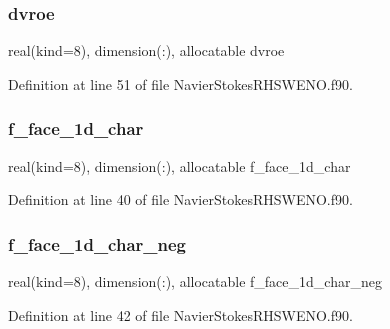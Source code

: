 \subsubsection{\texorpdfstring{dvroe}{dvroe}}
{\footnotesize\ttfamily real(kind=8), dimension(\+:), allocatable dvroe}



Definition at line 51 of file Navier\+Stokes\+R\+H\+S\+W\+E\+N\+O.\+f90.

\hypertarget{structnavierstokesrhsweno_1_1dissipation__local_ad9216552a914fcb2777025779fc3185c}{}\label{structnavierstokesrhsweno_1_1dissipation__local_ad9216552a914fcb2777025779fc3185c} 
\subsubsection{\texorpdfstring{f\+\_\+face\+\_\+1d\+\_\+char}{f\_face\_1d\_char}}
{\footnotesize\ttfamily real(kind=8), dimension(\+:), allocatable f\+\_\+face\+\_\+1d\+\_\+char}



Definition at line 40 of file Navier\+Stokes\+R\+H\+S\+W\+E\+N\+O.\+f90.

\hypertarget{structnavierstokesrhsweno_1_1dissipation__local_af61d496e7bd3e0b2c7c4ae459886b50b}{}\label{structnavierstokesrhsweno_1_1dissipation__local_af61d496e7bd3e0b2c7c4ae459886b50b} 
\subsubsection{\texorpdfstring{f\+\_\+face\+\_\+1d\+\_\+char\+\_\+neg}{f\_face\_1d\_char\_neg}}
{\footnotesize\ttfamily real(kind=8), dimension(\+:), allocatable f\+\_\+face\+\_\+1d\+\_\+char\+\_\+neg}



Definition at line 42 of file Navier\+Stokes\+R\+H\+S\+W\+E\+N\+O.\+f90.


